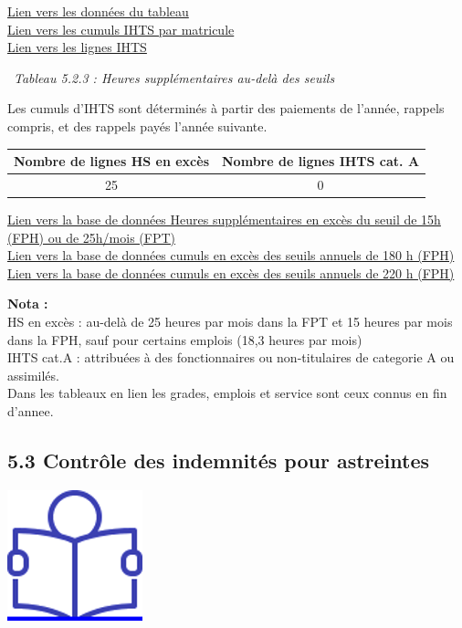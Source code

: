 \href{../Bases/Reglementation/CumHS.csv}{Lien vers les données du
tableau}\\
\href{../Bases/Reglementation/lignes.IHTS.tot.csv}{Lien vers les cumuls
IHTS par matricule}\\
\href{../Bases/Reglementation/lignes.IHTS.csv}{Lien vers les lignes IHTS}

~\emph{Tableau 5.2.3 : Heures supplémentaires au-delà des seuils}

Les cumuls d'IHTS sont déterminés à partir des paiements de l'année,
rappels compris, et des rappels payés l'année suivante.

\begin{longtable}[]{@{}cc@{}}
\toprule
Nombre de lignes HS en excès & Nombre de lignes IHTS cat.
A\tabularnewline
\midrule
\endhead
25 & 0\tabularnewline
\bottomrule
\end{longtable}

\href{../Bases/Reglementation/HS.sup.25.csv}{Lien vers la base de données
Heures supplémentaires en excès du seuil de 15h (FPH) ou de 25h/mois
(FPT)}\\
\href{../Bases/Reglementation/Depassement.seuil.180h.csv}{Lien vers la base
de données cumuls en excès des seuils annuels de 180 h (FPH)}\\
\href{../Bases/Reglementation/Depassement.seuil.220h.csv}{Lien vers la base
de données cumuls en excès des seuils annuels de 220 h (FPH)}

\textbf{Nota :}\\
HS en excès : au-delà de 25 heures par mois dans la FPT et 15 heures par
mois dans la FPH, sauf pour certains emplois (18,3 heures par mois)\\
IHTS cat.A : attribuées à des fonctionnaires ou non-titulaires de
categorie A ou assimilés.\\
Dans les tableaux en lien les grades, emplois et service sont ceux
connus en fin d'annee.

\hypertarget{controle-des-indemnites-pour-astreintes}{%
\subsection{5.3 Contrôle des indemnités pour
astreintes}\label{controle-des-indemnites-pour-astreintes}}

\href{../Docs/Notices/fiche_astreintes.odt}{\includegraphics{icones/Notice.png}}

